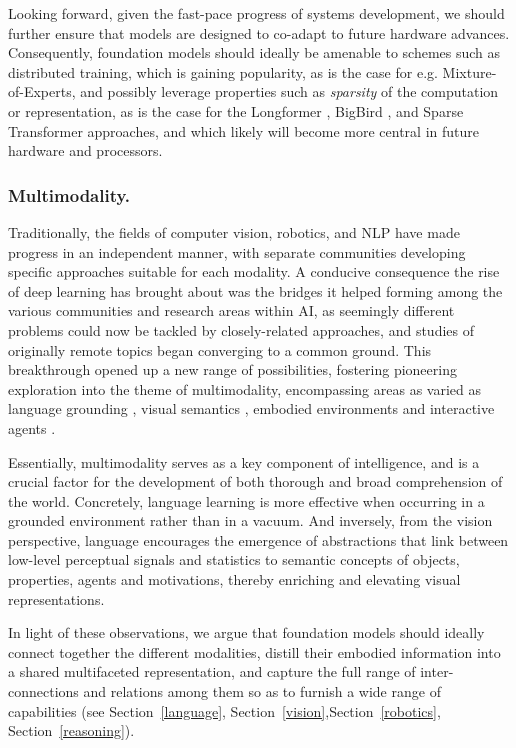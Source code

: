 Looking forward, given the fast-pace progress of systems development, we should further ensure that models are designed to co-adapt to future hardware advances. Consequently, foundation models should ideally be amenable to schemes such as distributed training, which is gaining popularity, as is the case for e.g. Mixture-of-Experts, and possibly leverage properties such as \textit{sparsity} of the computation or representation, as is the case for the Longformer \citep{longformer}, BigBird \citep{bigbird}, and Sparse Transformer \citep{child2019generating} approaches, and which likely will become more central in future hardware and processors.

\subsubsection{Multimodality.} Traditionally, the fields of computer vision, robotics, and NLP have made progress in an independent manner, with separate communities developing specific approaches suitable for each modality. A conducive consequence the rise of deep learning has brought about was the bridges it helped forming among the various communities and research areas within AI, as seemingly different problems could now be tackled by closely-related approaches, and studies of originally remote topics began converging to a common ground. This breakthrough opened up a new range of possibilities, fostering pioneering exploration into the theme of multimodality, encompassing  areas as varied as language grounding \citep{lynch2020grounding}, visual semantics \citep{conser2019revisiting},  embodied environments \citep{embodied} and interactive agents \citep{interactive}.

Essentially, multimodality serves as a key component of intelligence, and is a crucial factor for the development of both thorough and broad comprehension of the world. Concretely, language learning is more effective when occurring in a grounded environment rather than in a vacuum. And inversely, from the vision perspective, language encourages the emergence of abstractions that link between low-level perceptual signals and statistics to semantic concepts of objects, properties, agents and motivations, thereby enriching and elevating visual representations. 

In light of these observations, we argue that foundation models should ideally connect together the different modalities, distill their embodied information into a shared multifaceted representation, and capture the full range of inter-connections and relations among them so as  to furnish a wide range of capabilities (see Section~\ref{language},  Section~\ref{vision},Section~\ref{robotics}, Section~\ref{reasoning}).

